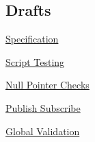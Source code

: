 \subsection*{Drafts}


\begin{DoxyItemize}
\item \hyperlink{doc_decisions_specification_md}{Specification}
\item \hyperlink{doc_decisions_script_testing_md}{Script Testing}
\item \hyperlink{doc_decisions_null_pointer_checks_md}{Null Pointer Checks}
\item \hyperlink{doc_decisions_pubsub_md}{Publish Subscribe}
\item \hyperlink{doc_decisions_global_validation_md}{Global Validation} 
\end{DoxyItemize}